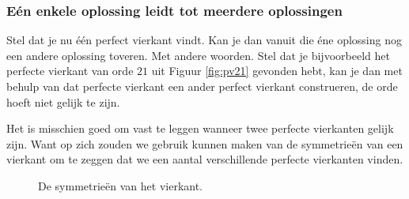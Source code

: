 \subsubsection{E\'en enkele oplossing leidt tot meerdere oplossingen}

Stel dat je nu \'e\'en perfect vierkant vindt. Kan je dan vanuit die \'ene oplossing nog een andere oplossing toveren. Met andere woorden. Stel dat je bijvoorbeeld het perfecte vierkant van orde $21$ uit Figuur \ref{fig:pv21} gevonden hebt, kan je dan met behulp van dat perfecte vierkant een ander perfect vierkant construeren, de orde hoeft niet gelijk te zijn.

Het is misschien goed om vast te leggen wanneer twee perfecte vierkanten gelijk zijn. Want op zich zouden we gebruik kunnen maken van de symmetrie\"en van een vierkant om te zeggen dat we een aantal verschillende perfecte vierkanten vinden.


\begin{figure}[ht]
  \centering
  



  \caption{De symmetrie\"en van het vierkant.}
  \label{fig:symmetrie_vierkant}
\end{figure}


